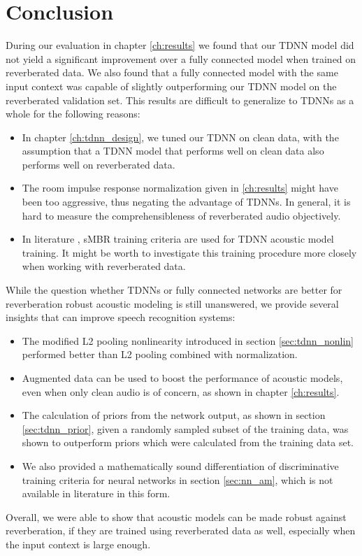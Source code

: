 
\chapter{Conclusion}
\label{ch:Conclusion}
During our evaluation in chapter \ref{ch:results} we found that our TDNN model did not yield a significant improvement over a fully connected model when trained on reverberated data. We also found that a fully connected model with the same input context was capable of slightly outperforming our TDNN model on the reverberated validation set. This results are difficult to generalize to TDNNs as a whole for the following reasons: 
\begin{itemize}
	\item In chapter \ref{ch:tdnn_design}, we tuned our TDNN on clean data, with the assumption that a TDNN model that performs well on clean data also performs well on reverberated data. 
	\item The room impulse response normalization given in \ref{ch:results} might have been too aggressive, thus negating the advantage of TDNNs. In general, it is hard to measure the comprehensibleness of reverberated audio objectively.  
	\item In literature \cite{peddinti2015jhu} \cite{peddinti2015reverberation}, sMBR training criteria are used for TDNN acoustic model training. It might be worth to investigate this training procedure more closely when working with reverberated data.  
\end{itemize}
While the question whether TDNNs or fully connected networks are better for reverberation robust acoustic modeling is still unanswered, we provide several insights that can improve speech recognition systems:
\begin{itemize}
	\item The modified L2 pooling nonlinearity introduced in section \ref{sec:tdnn_nonlin} performed better than L2 pooling combined with normalization.
	\item Augmented data can be used to boost the performance of acoustic models, even when only clean audio is of concern, as shown in chapter \ref{ch:results}.
	\item The calculation of priors from the network output, as shown in section \ref{sec:tdnn_prior}, given a randomly sampled subset of the training data, was shown to outperform priors which were calculated from the training data set. 
	\item We also provided a mathematically sound differentiation of discriminative training criteria for neural networks in section \ref{sec:nn_am}, which is not available in literature in this form.
\end{itemize}
Overall, we were able to show that acoustic models can be made robust against reverberation, if they are trained using reverberated data as well, especially when the input context is large enough. 